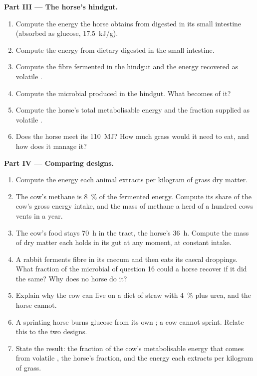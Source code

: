 \begin{problem}
\medskip
\noindent\textbf{Part III --- The horse's hindgut.}
\begin{enumerate}[resume]
  \item Compute the energy the horse obtains from  digested in
        its small intestine (absorbed as glucose, \qty{17.5}{kJ/g}).
  \item Compute the energy from dietary  digested in the small
        intestine.
  \item Compute the fibre fermented in the hindgut and the energy
        recovered as volatile .
  \item Compute the microbial  produced in the hindgut. What
        becomes of it?
  \item Compute the horse's total metabolisable energy and the
        fraction supplied as volatile .
  \item Does the horse meet its \qty{110}{MJ}? How much grass would it
        need to eat, and how does it manage it?
\end{enumerate}

\medskip
\noindent\textbf{Part IV --- Comparing designs.}
\begin{enumerate}[resume]
  \item Compute the energy each animal extracts per kilogram of grass
        dry matter.
  \item The cow's methane is \qty{8}{\%} of the fermented energy.
        Compute its share of the cow's gross energy intake, and the
        mass of methane a herd of a hundred cows vents in a year.
  \item The cow's food stays \qty{70}{h} in the tract, the horse's
        \qty{36}{h}. Compute the mass of dry matter each holds in its
        gut at any moment, at constant intake.
  \item A rabbit ferments fibre in its caecum and then eats its
        caecal droppings. What fraction of the microbial  of
        question 16 could a horse recover if it did the same? Why does
        no horse do it?
  \item Explain why the cow can live on a diet of straw with
        \qty{4}{\%}  plus urea, and the horse cannot.
  \item A sprinting horse burns glucose from its own ; a cow
        cannot sprint. Relate this to the two designs.
  \item State the result: the fraction of the cow's metabolisable
        energy that comes from volatile , the horse's
        fraction, and the energy each extracts per kilogram of grass.
\end{enumerate}
\end{problem}
